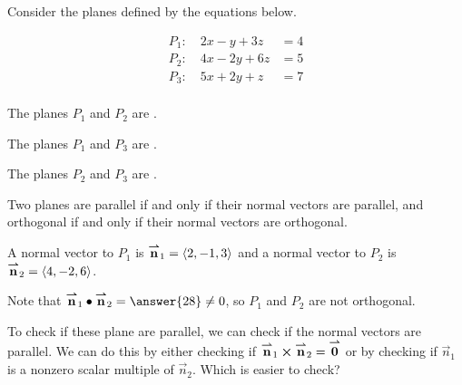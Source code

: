 \documentclass{ximera}
\author{Jim Talamo}
\begin{document}
\begin{exercise}

Consider the planes defined by the equations below.

\[
\begin{array}{lr}
P_1:  \quad 2x-y+3z &=4 \\
P_2:  \quad  4x-2y+6z &= 5 \\
P_3:  \quad  5x+2y+z &=7 \\
\end{array}
\]

The planes $P_1$ and $P_2$ are .

The planes $P_1$ and $P_3$ are .

The planes $P_2$ and $P_3$ are .

\begin{hint}
Two planes are parallel if and only if their normal vectors are parallel, and orthogonal if and only if their normal vectors are orthogonal.

A normal vector to $P_1$ is ${\overset{\boldsymbol{\rightharpoonup}}{\mathbf{n}}}_1 = \left\langle 2,-1,3\right\rangle$ and a normal vector to $P_2$ is ${\overset{\boldsymbol{\rightharpoonup}}{\mathbf{n}}}_2 = \left\langle 4,-2,6\right\rangle$.

Note that $\vec{n}_1 \dotp \vec{n}_2 = \answer{28} \neq 0$, so $P_1$ and $P_2$ are not orthogonal.

To check if these plane are parallel, we can check if the normal vectors are parallel.  We can do this by either checking if ${\overset{\boldsymbol{\rightharpoonup}}{\mathbf{n}}}_1 \boldsymbol\times {\overset{\boldsymbol{\rightharpoonup}}{\mathbf{n}}}_2 = {\overset{\boldsymbol{\rightharpoonup}}{\mathbf{0}}}$ or by checking if $\vec{n}_1$ is a  nonzero scalar multiple of $\vec{n}_2$.  Which is easier to check?
\end{hint}
\end{exercise}
\end{document}
